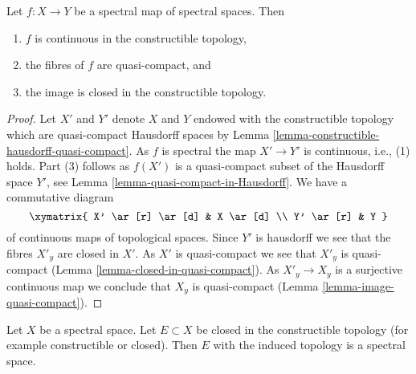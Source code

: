 \begin{lemma}
\label{lemma-fibres-spectral-map-quasi-compact}
Let $f : X \to Y$ be a spectral map of spectral spaces. Then
\begin{enumerate}
\item $f$ is continuous in the constructible topology,
\item the fibres of $f$ are quasi-compact, and
\item the image is closed in the constructible topology.
\end{enumerate}
\end{lemma}

\begin{proof}
Let $X'$ and $Y'$ denote $X$ and $Y$ endowed with the constructible topology
which are quasi-compact Hausdorff spaces by
Lemma \ref{lemma-constructible-hausdorff-quasi-compact}.
As $f$ is spectral the map $X' \to Y'$ is continuous, i.e., (1) holds.
Part (3) follows as $f(X')$ is a quasi-compact subset of the
Hausdorff space $Y'$, see Lemma \ref{lemma-quasi-compact-in-Hausdorff}.
We have a commutative diagram
$$
\xymatrix{
X' \ar[r] \ar[d] & X \ar[d] \\
Y' \ar[r] & Y
}
$$
of continuous maps of topological spaces. Since $Y'$ is hausdorff
we see that the fibres $X'_y$ are closed in $X'$. As $X'$ is quasi-compact
we see that $X'_y$ is quasi-compact
(Lemma \ref{lemma-closed-in-quasi-compact}).
As $X'_y \to X_y$ is a surjective continuous map we conclude
that $X_y$ is quasi-compact (Lemma \ref{lemma-image-quasi-compact}).
\end{proof}

\begin{lemma}
\label{lemma-spectral-sub}
Let $X$ be a spectral space. Let $E \subset X$ be closed in the constructible
topology (for example constructible or closed). Then $E$ with the induced
topology is a spectral space.
\end{lemma}

